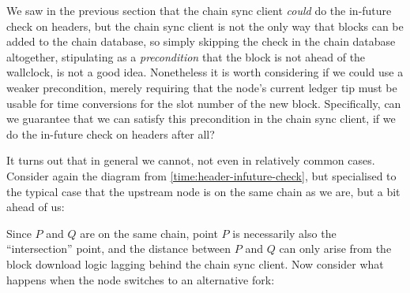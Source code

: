 We saw in the previous section that the chain sync client \emph{could} do the
in-future check on headers, but the chain sync client is not the only way that
blocks can be added to the chain database, so simply skipping the check in the
chain database altogether, stipulating as a \emph{precondition} that the block
is not ahead of the wallclock, is not a good idea. Nonetheless it is worth
considering if we could use a weaker precondition, merely requiring that the
node's current ledger tip must be usable for time conversions for the slot
number of the new block. Specifically, can we guarantee that we can satisfy this
precondition in the chain sync client, if we do the in-future check on headers
after all?

It turns out that in general we cannot, not even in relatively common cases.
Consider again the diagram from \cref{time:header-infuture-check}, but
specialised to the typical case that the upstream node is on the same chain as
we are, but a bit ahead of us:

\begin{center}
\end{center}

Since $P$ and $Q$ are on the same chain,  point $P$ is necessarily also the
``intersection'' point, and the distance between $P$ and $Q$ can only arise from
the block download logic lagging behind the chain sync client.
Now consider what happens when the node switches to an alternative fork:

\begin{center}
\end{center}

